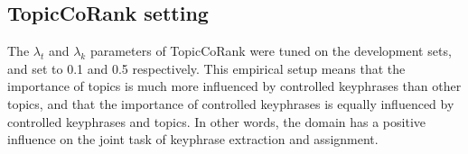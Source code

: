     \subsection{TopicCoRank setting}
    \label{subsec:topiccorank_settings}
        The $\lambda_t$ and $\lambda_k$ parameters of TopicCoRank were tuned on the development sets, and set to 0.1 and 0.5 respectively.
        This empirical setup means that the importance of topics is much more influenced by controlled keyphrases than other topics, and that the importance of controlled keyphrases is equally influenced by controlled keyphrases and topics.
        In other words, the domain has a positive influence on the joint task of keyphrase extraction and assignment.
